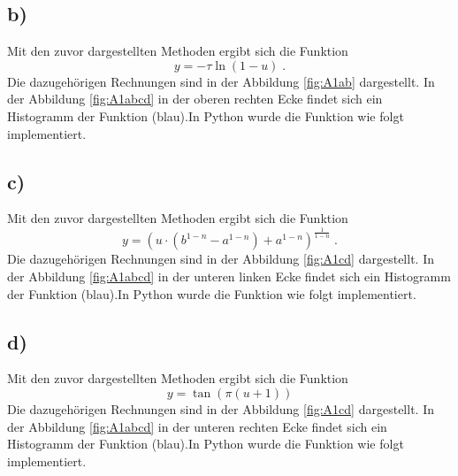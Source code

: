 

\subsection{b)}
Mit den zuvor dargestellten Methoden ergibt sich die Funktion
\begin{equation}
y = - \tau \ln(1-u) \; .	
\end{equation}
Die dazugehörigen Rechnungen sind in der Abbildung \ref{fig:A1ab} dargestellt.
In der Abbildung \ref{fig:A1abcd} in der oberen rechten Ecke findet sich ein Histogramm der 
Funktion (blau).In Python wurde die Funktion wie folgt implementiert.




\subsection{c)}
Mit den zuvor dargestellten Methoden ergibt sich die Funktion
\begin{equation}
y = \left( u \cdot \left(b^{1-n} - a^{1-n} \right) + a^{1-n} \right)^{\frac{1}{1-n}} \; .
\end{equation}
Die dazugehörigen Rechnungen sind in der Abbildung \ref{fig:A1cd} dargestellt.
In der Abbildung \ref{fig:A1abcd} in der unteren linken Ecke findet sich ein Histogramm der 
Funktion (blau).In Python wurde die Funktion wie folgt implementiert.



\subsection{d)}
Mit den zuvor dargestellten Methoden ergibt sich die Funktion
\begin{equation}
y = \tan ( \pi (u +1 ))
\end{equation}
Die dazugehörigen Rechnungen sind in der Abbildung \ref{fig:A1cd} dargestellt.
In der Abbildung \ref{fig:A1abcd} in der unteren rechten Ecke findet sich ein Histogramm der 
Funktion (blau).In Python wurde die Funktion wie folgt implementiert.



